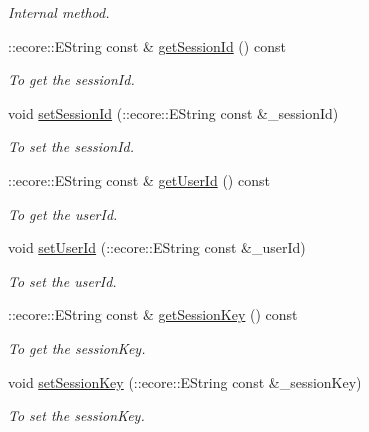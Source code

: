 \begin{DoxyCompactItemize}
\begin{DoxyCompactList}\small\item\em Internal method. \item\end{DoxyCompactList}\item 
::ecore::EString const \& \hyperlink{classUMS__Data_1_1Session_a0c0110f8ea44ec5f23323b973ac1ee83}{getSessionId} () const 
\begin{DoxyCompactList}\small\item\em To get the sessionId. \item\end{DoxyCompactList}\item 
void \hyperlink{classUMS__Data_1_1Session_a26bb17b956617155919f49e9b55ca77c}{setSessionId} (::ecore::EString const \&\_\-sessionId)
\begin{DoxyCompactList}\small\item\em To set the sessionId. \item\end{DoxyCompactList}\item 
::ecore::EString const \& \hyperlink{classUMS__Data_1_1Session_ae186728a00323007cf550d9f62a985ec}{getUserId} () const 
\begin{DoxyCompactList}\small\item\em To get the userId. \item\end{DoxyCompactList}\item 
void \hyperlink{classUMS__Data_1_1Session_a54a6da932c5f5278ea84662f605c6e68}{setUserId} (::ecore::EString const \&\_\-userId)
\begin{DoxyCompactList}\small\item\em To set the userId. \item\end{DoxyCompactList}\item 
::ecore::EString const \& \hyperlink{classUMS__Data_1_1Session_a1ab5bac0c8e47fada19138933fe367b5}{getSessionKey} () const 
\begin{DoxyCompactList}\small\item\em To get the sessionKey. \item\end{DoxyCompactList}\item 
void \hyperlink{classUMS__Data_1_1Session_a17382d1177c1ec879984919d90a175e9}{setSessionKey} (::ecore::EString const \&\_\-sessionKey)
\begin{DoxyCompactList}\small\item\em To set the sessionKey. \item\end{DoxyCompactList}\item 

\end{DoxyCompactItemize}
